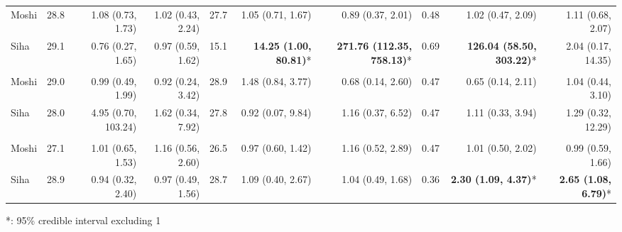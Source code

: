\begin{table}[t]
\begin{tabular*}{\linewidth}{@{\extracolsep{\fill}}l|rrrrrrrrr}
\midrule\addlinespace[2.5pt]
\multicolumn{10}{l}{Typhoid} \\[2.5pt] 
\midrule\addlinespace[2.5pt]
Moshi & 28.8 & 1.08 (0.73, 1.73) & 1.02 (0.43, 2.24) & 27.7 & 1.05 (0.71, 1.67) & 0.89 (0.37, 2.01) & 0.48 & 1.02 (0.47, 2.09) & 1.11 (0.68, 2.07) \\ 
Siha & 29.1 & 0.76 (0.27, 1.65) & 0.97 (0.59, 1.62) & 15.1 & \textbf{14.25 (1.00, 80.81)}* & \textbf{271.76 (112.35, 758.13)}* & 0.69 & \textbf{126.04 (58.50, 303.22)}* & 2.04 (0.17, 14.35) \\ 
\midrule\addlinespace[2.5pt]
\multicolumn{10}{l}{Leprosy} \\[2.5pt] 
\midrule\addlinespace[2.5pt]
Moshi & 29.0 & 0.99 (0.49, 1.99) & 0.92 (0.24, 3.42) & 28.9 & 1.48 (0.84, 3.77) & 0.68 (0.14, 2.60) & 0.47 & 0.65 (0.14, 2.11) & 1.04 (0.44, 3.10) \\ 
Siha & 28.0 & 4.95 (0.70, 103.24) & 1.62 (0.34, 7.92) & 27.8 & 0.92 (0.07, 9.84) & 1.16 (0.37, 6.52) & 0.47 & 1.11 (0.33, 3.94) & 1.29 (0.32, 12.29) \\ 
\midrule\addlinespace[2.5pt]
\multicolumn{10}{l}{Schistosomiasis} \\[2.5pt] 
\midrule\addlinespace[2.5pt]
Moshi & 27.1 & 1.01 (0.65, 1.53) & 1.16 (0.56, 2.60) & 26.5 & 0.97 (0.60, 1.42) & 1.16 (0.52, 2.89) & 0.47 & 1.01 (0.50, 2.02) & 0.99 (0.59, 1.66) \\ 
Siha & 28.9 & 0.94 (0.32, 2.40) & 0.97 (0.49, 1.56) & 28.7 & 1.09 (0.40, 2.67) & 1.04 (0.49, 1.68) & 0.36 & \textbf{2.30 (1.09, 4.37)}* & \textbf{2.65 (1.08, 6.79)}* \\ 
\bottomrule
\end{tabular*}
\begin{minipage}{\linewidth}
*: 95\% credible interval excluding 1\\
\end{minipage}
\end{table}

